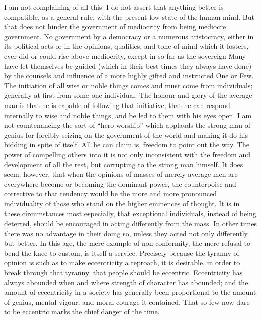 \documentclass[11pt,openany]{book}
\begin{document}
I am not complaining of all this. I do not assert that anything better is compatible, as a general rule, with the present low state of the human mind. But that does not hinder the government of mediocrity from being mediocre government. No government by a democracy or a numerous aristocracy, either in its political acts or in the opinions, qualities, and tone of mind which it fosters, ever did or could rise above mediocrity, except in so far as the sovereign Many have let themselves be guided (which in their best times they always have done) by the counsels and influence of a more highly gifted and instructed One or Few. The initiation of all wise or noble things comes and must come from individuals; generally at first from some one individual. The honour and glory of the average man is that he is capable of following that initiative; that he can respond internally to wise and noble things, and be led to them with his eyes open. I am not countenancing the sort of ``hero-worship'' which applauds the strong man of genius for forcibly seizing on the government of the world and making it do his bidding in spite of itself. All he can claim is, freedom to point out the way. The power of compelling others into it is not only inconsistent with the freedom and development of all the rest, but corrupting to the strong man himself. It does seem, however, that when the opinions of masses of merely average men are everywhere become or becoming the dominant power, the counterpoise and corrective to that tendency would be the more and more pronounced individuality of those who stand on the higher eminences of thought. It is in these circumstances most especially, that exceptional individuals, instead of being deterred, should be encouraged in acting differently from the mass. In other times there was no advantage in their doing so, unless they acted not only differently but better. In this age, the mere example of non-conformity, the mere refusal to bend the knee to custom, is itself a service. Precisely because the tyranny of opinion is such as to make eccentricity a reproach, it is desirable, in order to break through that tyranny, that people should be eccentric. Eccentricity has always abounded when and where strength of character has abounded; and the amount of eccentricity in a society has generally been proportional to the amount of genius, mental vigour, and moral courage it contained. That so few now dare to be eccentric marks the chief danger of the time.
\end{document}
